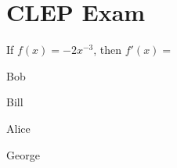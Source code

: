 \documentclass[../main.tex]{subfiles}
\begin{document}
\section{CLEP Exam}
%
\begin{problem}
    If $f(x)=-2x^{-3}$, then $f'(x)=$
    \begin{enumerate}[label=(\Alph*)]
        \begin{multicols}{4}
            \item Bob
            \item Bill
            \item Alice
            \item George
        \end{multicols}
    \end{enumerate}
\end{problem}
\end{document}

